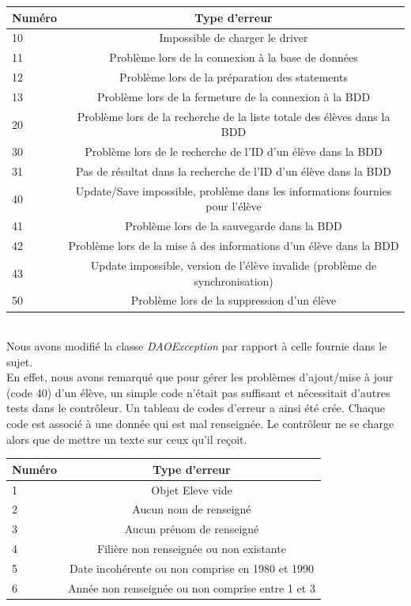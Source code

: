 \documentclass[a4paper,12pt]{article}
\begin{document}
\begin{tabular}{|l|c|}
  \hline
  Numéro & Type d'erreur \\
  \hline
	10 & Impossible de charger le driver \\
	11 & Problème lors de la connexion à la base de données \\
	12 & Problème lors de la préparation des statements \\
 	13 & Problème lors de la fermeture de la connexion à la BDD \\
	20 & Problème lors de la recherche de la liste totale des élèves dans la BDD \\
	30 & Problème lors de le recherche de l'ID d'un élève dans la BDD\\
	31 & Pas de résultat dans la recherche de l'ID d'un élève dans la BDD \\
	40 & Update/Save impossible, problème dans les informations fournies pour l'élève \\
	41 & Problème lors de la sauvegarde dans la BDD \\
	42 & Problème lors de la mise à des informations d'un élève dans la BDD\\
	43 & Update impossible, version de l'élève invalide (problème de synchronisation)\\
	50 & Problème lors de la suppression d'un élève \\
  \hline
\end{tabular}
~\\

Nous avons modifié la classe \textit{DAOException} par rapport à celle fournie dans le sujet.\\
En effet, nous avons remarqué que pour gérer les problèmes d'ajout/mise à jour (code 40) d'un élève,
un simple code n'était pas suffisant et nécessitait d'autres tests dans le contrôleur. Un tableau de codes
d'erreur a ainsi été crée. Chaque code est associé à une donnée qui est mal renseignée. Le contrôleur ne se charge
alors que de \og mettre un texte \fg sur ceux qu'il reçoit.\\

\begin{tabular}{|l|c|}
  \hline
Numéro & Type d'erreur \\
  \hline
	1 & Objet Eleve vide \\
	2 & Aucun nom de renseigné \\
	3 & Aucun prénom de renseigné \\
	4 & Filière non renseignée ou non existante \\
	5 & Date incohérente ou non comprise en 1980 et 1990\\
	6 & Année non renseignée ou non comprise entre 1 et 3 \\
  \hline
\end{tabular}
\end{document}
